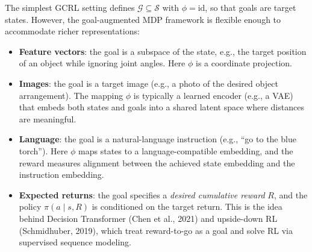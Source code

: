 \documentclass[11pt, letterpaper]{article}
\begin{document}
\begin{concept}
    The simplest GCRL setting defines \(\mathcal{G} \subseteq \mathcal{S}\) with \(\phi = \text{id}\), so that goals are target states. However, the goal-augmented MDP framework is flexible enough to accommodate richer representations:
    \begin{itemize}
        \item \textbf{Feature vectors}: the goal is a subspace of the state, e.g., the target position of an object while ignoring joint angles. Here \(\phi\) is a coordinate projection.
        \item \textbf{Images}: the goal is a target image (e.g., a photo of the desired object arrangement). The mapping \(\phi\) is typically a learned encoder (e.g., a VAE) that embeds both states and goals into a shared latent space where distances are meaningful.
        \item \textbf{Language}: the goal is a natural-language instruction (e.g., ``go to the blue torch''). Here \(\phi\) maps states to a language-compatible embedding, and the reward measures alignment between the achieved state embedding and the instruction embedding.
        \item \textbf{Expected returns}: the goal specifies a \textit{desired cumulative reward} \(R\), and the policy \(\pi(a \mid s, R)\) is conditioned on the target return. This is the idea behind Decision Transformer (Chen et al., 2021) and upside-down RL (Schmidhuber, 2019), which treat reward-to-go as a goal and solve RL via supervised sequence modeling.
    \end{itemize}
\end{concept}
 
\end{document}
